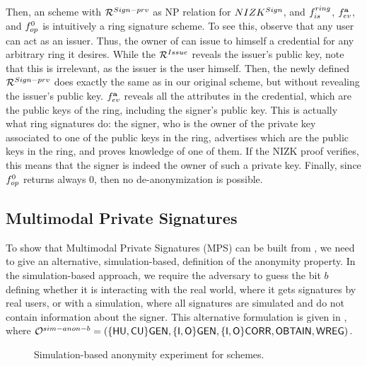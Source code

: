 Then, an \UAS scheme with $\mathcal{R}^{Sign-prv}$ as NP relation for
$NIZK^{Sign}$, and $f_{is}^{ring}$, $f_{ev}^{\mathbf{a}}$, and $f_{op}^0$ is
intuitively a ring signature scheme. To see this, observe that any user can
act as an issuer. Thus, the owner of \usk can issue to himself a credential
for any arbitrary ring it desires. While the $\mathcal{R}^{Issue}$ reveals the
issuer's public key, note that this is irrelevant, as the issuer is the user
himself. Then, the newly defined $\mathcal{R}^{Sign-prv}$ does exactly the same
as in our original \UAS scheme, but without revealing the issuer's public key.
$f_{ev}^{\mathbf{a}}$ reveals all the attributes in the credential, which are
the public keys of the ring, including the signer's public key. This is actually
what ring signatures do: the signer, who is the owner of the private key
associated to one of the public keys in the ring, advertises which are the
public keys in the ring, and proves knowledge of one of them. If the NIZK
proof verifies, this means that the signer is indeed the owner of such a private
key. Finally, since $f_{op}^0$ returns always $0$, then no de-anonymization is
possible.

\subsection{Multimodal Private Signatures}


To show that Multimodal Private Signatures (MPS) \needcite can be built from
\UAS, we need to give an alternative, simulation-based, definition of the
anonymity property. In the simulation-based approach, we require the adversary
to guess the bit $b$ defining whether it is interacting with the real world,
where it gets signatures by real users, or with a simulation, where all
signatures are simulated and do not contain information about the signer.
This alternative formulation is given in , where
$\mathcal{O}^{sim-anon-b} = (\lbrace\mathsf{HU},\mathsf{CU}\rbrace\mathsf{GEN},\lbrace\mathsf{I},\mathsf{O}\rbrace\mathsf{GEN},\lbrace\mathsf{I},
\mathsf{O}\rbrace\mathsf{CORR},\mathsf{OBTAIN},\mathsf{WREG})$.

\begin{figure}[htp!]

  \centering
  
  \caption{Simulation-based anonymity experiment for \UAS schemes.}
  \label{fig:exp-uas-simanon}
\end{figure}

